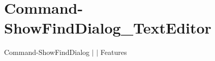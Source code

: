 \chapter{Command-\/\+Show\+Find\+Dialog\+\_\+\+Text\+Editor }
\hypertarget{md__docs_2_text_editor_2_features_2_command-_show_find_dialog___text_editor}{}\label{md__docs_2_text_editor_2_features_2_command-_show_find_dialog___text_editor}
Command-\/\+Show\+Find\+Dialog \texorpdfstring{$\vert$}{|}  \texorpdfstring{$\vert$}{|} Features



 